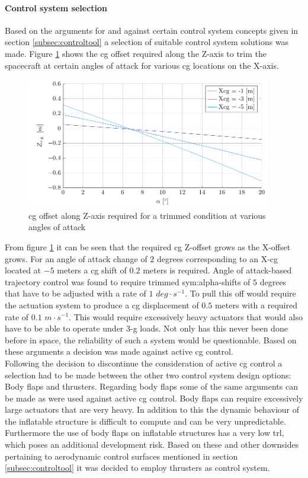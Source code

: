 \paragraph{Control system selection}
Based on the arguments for and against certain control system concepts given in section \ref{subsec:controltool} a selection of suitable control system solutions was made. Figure \ref{fig:cgoffset} shows the \gls{cg} offset required along the Z-axis to trim the spacecraft at certain angles of attack for various \gls{cg} locations on the X-axis. 
\begin{figure}[h]
	\centering
	\includegraphics[width=0.95\textwidth]{./Figure/control/moment}
	\caption{\gls{cg} offset along Z-axis required for a trimmed condition at various angles of attack}
	\label{fig:cgoffset}
\end{figure}
From figure \ref{fig:cgoffset} it can be seen that the required \gls{cg} Z-offset grows as the X-offset grows. For an angle of attack change of $2$ degrees corresponding to an X-\gls{cg} located at $-5$ meters a \gls{cg} shift of $0.2$ meters is required. Angle of attack-based trajectory control was found to require trimmed \gls{sym:alpha}-shifts of $5$ degrees that have to be adjusted with a rate of $1$ $deg \cdot s^{-1}$. To pull this off would require the actuation system to produce a \gls{cg} displacement of $0.5$ meters with a required rate of $0.1$ $m \cdot s^{-1}$. This would require excessively heavy actuators that would also have to be able to operate under 3-g loads. Not only has this never been done before in space, the reliability of such a system would be questionable. Based on these arguments a decision was made against active \gls{cg} control.\\
Following the decision to discontinue the consideration of active \gls{cg} control a selection had to be made between the other two control system design options: Body flaps and thrusters. Regarding body flaps some of the same arguments can be made as were used against active \gls{cg} control. Body flaps can require excessively large actuators that are very heavy. In addition to this the dynamic behaviour of the inflatable structure is difficult to compute and can be very unpredictable. Furthermore the use of body flaps on inflatable structures has a very low \acrlong{trl}, which poses an additional development risk. Based on these and other downsides pertaining to aerodynamic control surfaces mentioned in section \ref{subsec:controltool} it was decided to employ thrusters as control system.

